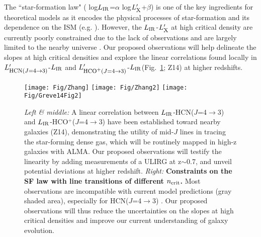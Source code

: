 \documentclass[12pt,a4paper]{article}
\newcommand{\ncrit}{\mbox{$n_{\rm crit}$}\xspace}
\newcommand{\Lsun}{\mbox{L$_{\odot}$}\xspace}
\newcommand{\LIR}{\mbox{$L_{\rm IR}$}\xspace}
\newcommand{\rarr}{$\rightarrow$}
\newcommand{\dhcn}{HCN($J$=4\rarr3)\xspace}
\newcommand{\dhcop}{HCO$^+$($J$=4\rarr3)\xspace}
\newcommand{\Lp}[1][CO]{\mbox{$L^{\prime}_\textrm{\fontsize{8pt}{12pt}\selectfont{#1}}$}}
\newcommand{\Fig}[1]{Fig.~\ref{fig:#1}}
\begin{document}
The ``star-formation law" (%
log\LIR=$\alpha$ log\Lp[X]+$\beta$)
is one of the key ingredients %
for theoretical models as it encodes the physical processes 
of star-formation and its dependence on the ISM 
(e.g. \citealt{Narayanan14a}).
However, the \LIR-\Lp[X] at high critical density are currently poorly constrained due to the lack of observations 
and are largely limited to the nearby universe
\citep[\Fig{SF};][]{Greve14a}. Our proposed observations will help delineate 
the slopes at high critical densities and 
explore the linear correlations found 
locally in \Lp[\dhcn]-\LIR and \Lp[\dhcop]-\LIR (\Fig{SF}; Z14) at higher redshifts.
%
\begin{figure*}[!tbph]
\centering
\texttt{[image: Fig/Zhang]}
\texttt{[image: Fig/Zhang2]}
\texttt{[image: Fig/Greve14Fig2]}
\caption{ \fontsize{10pt}{12pt}\selectfont {\textbf{The SF law: log \LIR = $\alpha$ log \Lp[X]+$\beta$.}}
{\em Left \& middle:}
A linear correlation between \LIR-\dhcn and \LIR-\dhcop have been established toward nearby galaxies 
(Z14), demonstrating the utility of mid-$J$ lines in tracing 
the star-forming dense gas, which will be routinely mapped in high-z galaxies with ALMA.
Our proposed observations will testify the linearity by adding measurements of a ULIRG at z$\sim$0.7, 
and unveil potential deviations at higher redshift.
{\em Right:} \textbf{Constraints on the SF law 
with line transitions of different \ncrit.}
Most observations are incompatible with current model predictions (gray shaded area),
especially for \dhcn
\citep{Greve14a}.
Our proposed observations will thus reduce the uncertainties on the slopes at high critical densities
and improve our current understanding of galaxy evolution.
\label{fig:SF}}
\end{figure*}
\end{document}
